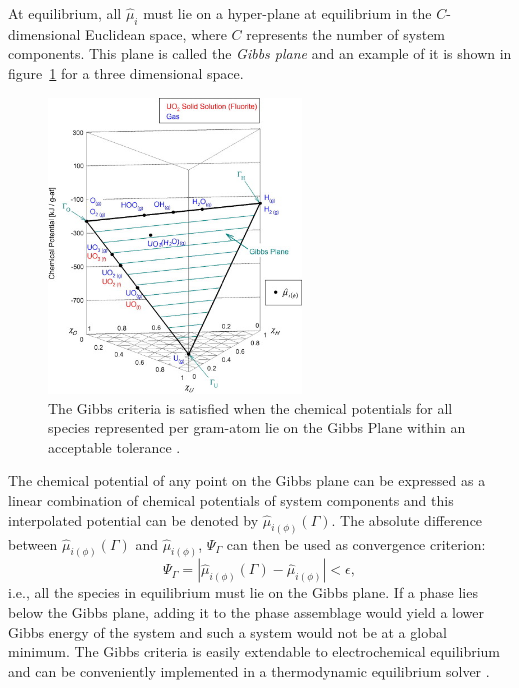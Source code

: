 \begin{enumerate}
	 At equilibrium, all $\hat{\mu}_{i}$ must lie on a hyper-plane at equilibrium in the $C$-dimensional Euclidean space, where $C$ represents the number of system components. This plane is called the \emph{Gibbs plane} and an example of it is shown in figure~\ref{fig:GibbsPlane} for a three dimensional space.
	 \begin{figure}[h!]
		\centering
		\includegraphics[width=0.6\textwidth]{figures/chapter-4/Gibbs_plane.jpg}
		\caption[The Gibbs criteria is satisfied when the chemical potentials for all species represented per gram-atom lie on the Gibbs Plane within an acceptable tolerance.]{The Gibbs criteria is satisfied when the chemical potentials for all species represented per gram-atom lie on the Gibbs Plane within an acceptable tolerance \cite{Piro11a}.}
		\label{fig:GibbsPlane}
	\end{figure}

	The chemical potential of any point on the Gibbs plane can be expressed as a linear combination of  chemical potentials of system components and this interpolated potential can be denoted by $\hat{\mu}_{i(\phi)}(\Gamma)$. The absolute difference between $\hat{\mu}_{i(\phi)}(\Gamma)$ and $\hat{\mu}_{i(\phi)}$, $\Psi_{\Gamma}$ can then be used as convergence criterion:
		\begin{equation}\label{eqn:convGC}
			\Psi_{\Gamma} = \left \vert  \hat{\mu}_{i(\phi)}(\Gamma) - \hat{\mu}_{i(\phi)} \right \vert < \epsilon,
		\end{equation}
	 i.e., all the species in equilibrium must lie on the Gibbs plane. If a phase lies below the Gibbs plane, adding it to the phase assemblage would yield a lower Gibbs energy of the system and such a system would not be at a global minimum. The Gibbs criteria is easily extendable to electrochemical equilibrium and can be conveniently implemented in a thermodynamic equilibrium solver \cite{Piro11a}.
	 \end{enumerate}
	 
